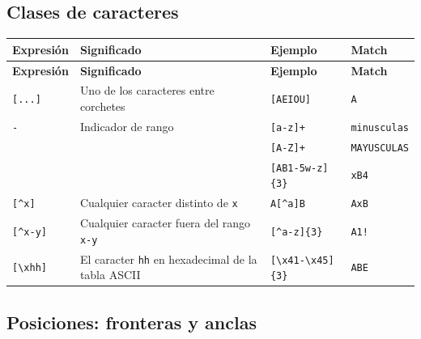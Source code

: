 \documentclass[a4paper, 8pt]{extarticle}
\begin{document}
\subsection*{Clases de caracteres}

\begin{longtable}{@{} p{2cm} p{7.5cm} p{3cm} p{5cm} @{}}
\toprule
\textbf{Expresión} & \textbf{Significado} & \textbf{Ejemplo} & \textbf{Match} \\
\midrule
\endfirsthead
\toprule
\textbf{Expresión} & \textbf{Significado} & \textbf{Ejemplo} & \textbf{Match} \\
\midrule
\endhead
\bottomrule
\endfoot
\bottomrule
\endlastfoot

\centering \verb![...]!  & Uno de los caracteres entre corchetes                  & \verb![AEIOU]!        & \verb!A!          \\
\centering \verb!-!      & Indicador de rango                                     & \verb![a-z]+!         & \verb!minusculas! \\
                         &                                                        & \verb![A-Z]+!         & \verb!MAYUSCULAS! \\
                         &                                                        & \verb![AB1-5w-z]{3}!  & \verb!xB4!        \\
\centering \verb![^x]!   & Cualquier caracter distinto de \verb!x!                & \verb!A[^a]B!         & \verb!AxB!        \\
\centering \verb![^x-y]! & Cualquier caracter fuera del rango \verb!x-y!          & \verb![^a-z]{3}!      & \verb|A1!|        \\
\centering \verb![\xhh]! & El caracter \verb!hh! en hexadecimal de la tabla ASCII & \verb![\x41-\x45]{3}! & \verb!ABE!        \\
\end{longtable}


\subsection*{Posiciones: fronteras y anclas}
\end{document}
